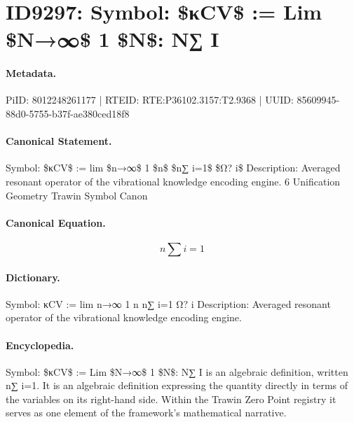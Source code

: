 \section*{ID9297: Symbol: \$κCV\$ := Lim \$N→∞\$ 1 \$N\$: N∑ I}
\paragraph{Metadata.}
PiID: 8012248261177 | RTEID: RTE:P36102.3157:T2.9368 | UUID: 85609945-88d0-5755-b37f-ae380ced18f8

\paragraph{Canonical Statement.}
Symbol: \$κCV\$ := lim \$n→∞\$ 1 \$n\$ \$n∑ i=1\$ \$Ω? i\$ Description: Averaged resonant operator of the vibrational knowledge encoding engine. 6 Unification Geometry Trawin Symbol Canon

\paragraph{Canonical Equation.}
\[
n∑ i=1
\]

\paragraph{Dictionary.}
Symbol: κCV := lim n→∞ 1 n n∑ i=1 Ω? i Description: Averaged resonant operator of the vibrational knowledge encoding engine.

\paragraph{Encyclopedia.}
Symbol: \$κCV\$ := Lim \$N→∞\$ 1 \$N\$: N∑ I is an algebraic definition, written n∑ i=1. It is an algebraic definition expressing the quantity directly in terms of the variables on its right-hand side. Within the Trawin Zero Point registry it serves as one element of the framework's mathematical narrative.
